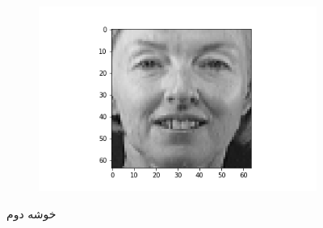 \documentclass[12pt, a4paper]{article}
\begin{document}
\begin{figure}[h]
\begin{subfigure}{0.3\linewidth}
        \includegraphics[width=\linewidth]{images/q3/c/1/2.png}
    \end{subfigure}
    \caption{خوشه دوم}
\end{figure}
\end{document}
